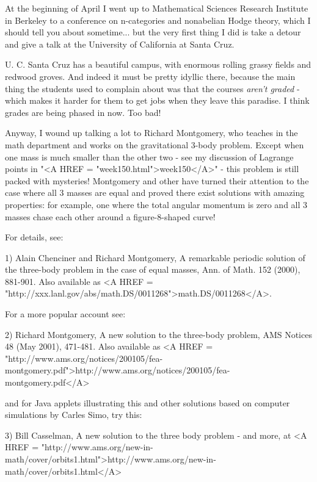 



At the beginning of April I went up to Mathematical Sciences Research
Institute in Berkeley to a conference on n-categories and nonabelian
Hodge theory, which I should tell you about sometime... but the very
first thing I did is take a detour and give a talk at the University 
of California at Santa Cruz.   

U. C. Santa Cruz has a beautiful campus, with enormous rolling grassy
fields and redwood groves.  And indeed it must be pretty idyllic
there, because the main thing the students used to complain about was
that the courses \emph{aren't graded} - which makes it harder for them to get
jobs when they leave this paradise.  I think grades are being phased in
now.  Too bad!

Anyway, I wound up talking a lot to Richard Montgomery, who teaches in
the math department and works on the gravitational 3-body problem.
Except when one mass is much smaller than the other two - see my
discussion of Lagrange points in "<A HREF = "week150.html">week150</A>" - this problem is still
packed with mysteries!  Montgomery and other have turned their attention
to the case where all 3 masses are equal and proved there exist
solutions with
amazing properties: for example, one where the total angular momentum is
zero and all 3 masses chase each other around a figure-8-shaped curve!

For details, see:

1) Alain Chenciner and Richard Montgomery, A remarkable periodic
solution of the three-body problem in the case of equal masses, 
Ann. of Math. 152 (2000), 881-901.  Also available as <A HREF = "http://xxx.lanl.gov/abs/math.DS/0011268">math.DS/0011268</A>.

For a more popular account see:

2) Richard Montgomery, A new solution to the three-body problem, 
AMS Notices 48 (May 2001), 471-481.  Also available as
<A HREF = "http://www.ams.org/notices/200105/fea-montgomery.pdf">http://www.ams.org/notices/200105/fea-montgomery.pdf</A>

and for Java applets illustrating this and other solutions based on
computer simulations by Carles Simo, try this:

3) Bill Casselman, A new solution to the three body problem - and more,
at <A HREF = "http://www.ams.org/new-in-math/cover/orbits1.html">http://www.ams.org/new-in-math/cover/orbits1.html</A>

